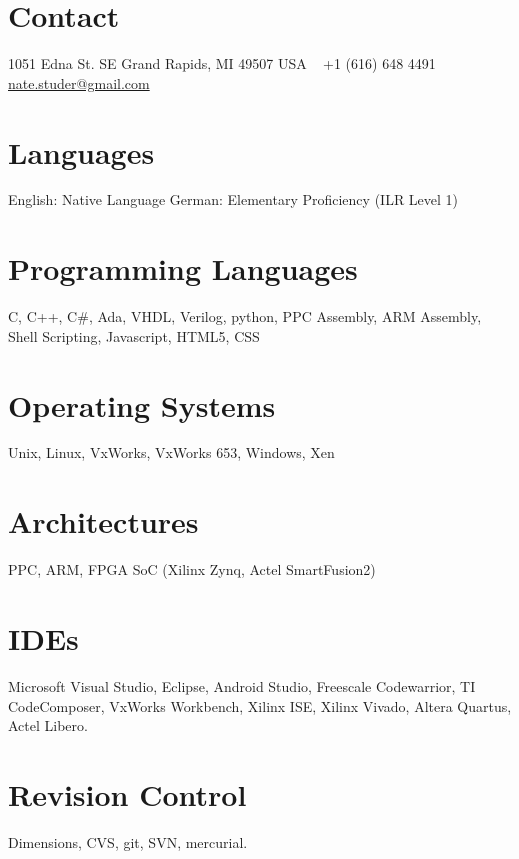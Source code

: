 \documentclass[print]{template/friggeri-cv} %
\begin{document}


\begin{aside} %
\section{Contact}
1051 Edna St. SE
Grand Rapids, MI 49507
USA
~
+1 (616) 648 4491
~
\href{mailto:nate.studer@gmail.com}{nate.studer@gmail.com}
\section{Languages}
English:  Native Language
German:  Elementary Proficiency (ILR Level 1)
\section{Programming Languages}
C, C++, C\#, Ada, VHDL, Verilog, python, PPC Assembly, ARM Assembly, Shell Scripting, Javascript, HTML5, CSS
\section{Operating Systems}
Unix, Linux, VxWorks, VxWorks 653, Windows, Xen
\section{Architectures}
PPC, ARM, FPGA SoC (Xilinx Zynq, Actel SmartFusion2)
\section{IDEs}
Microsoft Visual Studio, Eclipse, Android Studio, Freescale Codewarrior, TI CodeComposer, VxWorks Workbench, Xilinx ISE, Xilinx Vivado, Altera Quartus, Actel Libero.
\section{Revision Control}
Dimensions, CVS, git, SVN, mercurial.
\end{aside}

\end{document}
